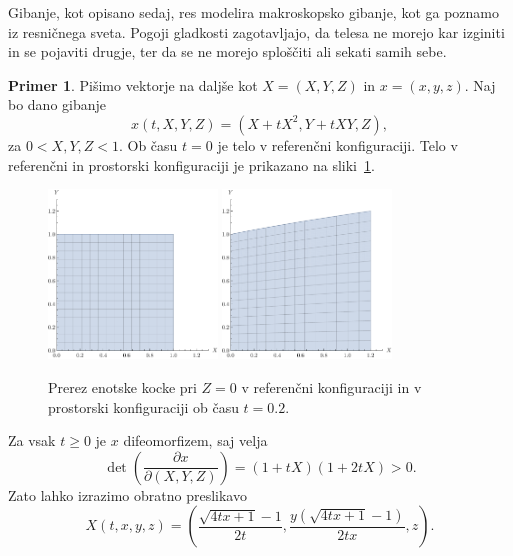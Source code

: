 \documentclass[12pt,a4paper,twoside]{article}
\theoremstyle{definition} %
\newtheorem{primer}[definicija]{Primer}
\theoremstyle{plain} %
\numberwithin{equation}{section}
\newcommand{\dpar}[2]{\ensuremath{\frac{\partial #1}{\partial #2}}}
\newcommand{\vX}{X}
\newcommand{\vx}{x}
\begin{document}
Gibanje, kot opisano sedaj, res modelira makroskopsko gibanje, kot ga poznamo iz
resničnega sveta. Pogoji gladkosti zagotavljajo, da telesa ne morejo kar izginiti in se
pojaviti drugje, ter da se ne morejo sploščiti ali sekati samih sebe.

\begin{primer}
  \label{prim:gib}
  Pišimo vektorje na daljše kot $\vX = (X,Y,Z)$ in $\vx = (x, y, z)$.
  Naj bo dano gibanje \[
  \vx(t, X, Y, Z) = (X + t X^2, Y + t X Y, Z), \]
  za $0 <
  X, Y, Z < 1$.  Ob času $t=0$ je telo v referenčni konfiguraciji. Telo v referenčni
  in prostorski konfiguraciji je prikazano na sliki~\ref{fig:gibanje}.
  \begin{figure}[h]
    \centering
    \includegraphics[width=0.4\textwidth]{images/gibanje0.pdf}
    \hspace{1em}
    \includegraphics[width=0.4\textwidth]{images/gibanje02.pdf}
    \caption{Prerez enotske kocke pri $Z = 0$ v referenčni konfiguraciji in v prostorski
    konfiguraciji ob času $t=0.2$.}
    \label{fig:gibanje}
  \end{figure}
  Za vsak $t\geq 0$ je $\vx$ difeomorfizem, saj velja
  \[ \det\left( \dpar{\vx}{(X, Y, Z)} \right) = (1+tX)(1+2tX) > 0. \]
  Zato lahko izrazimo obratno preslikavo
  \begin{equation}
    \vX(t, x, y, z) = \left(\frac{\sqrt{4 t x+1}-1}{2 t},\frac{y
    \left(\sqrt{4 t x+1}-1\right)}{2 t x}, z\right).
    \label{eq:gibanje-inv}
  \end{equation}
\end{primer}
\end{document}
